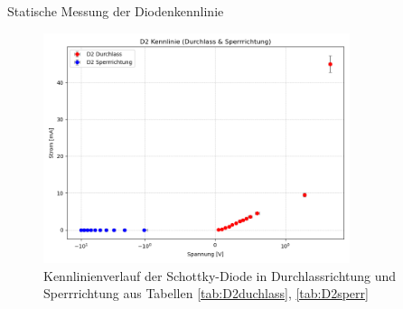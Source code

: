 \documentclass{article}
\theoremstyle{definition}
\begin{document}
\begin{aufgabe}{Statische Messung der Diodenkennlinie}
    \begin{figure}[H]
        \centering
        \includegraphics[width=0.8\textwidth]{figs/dioden_d2_combined.png}
        \caption{Kennlinienverlauf der Schottky-Diode in Durchlassrichtung und Sperrrichtung aus Tabellen \ref{tab:D2duchlass}, \ref{tab:D2sperr}}
        \label{dioden_d1_combined}
    \end{figure}

    
\end{aufgabe}
\newpage 
\end{document}
